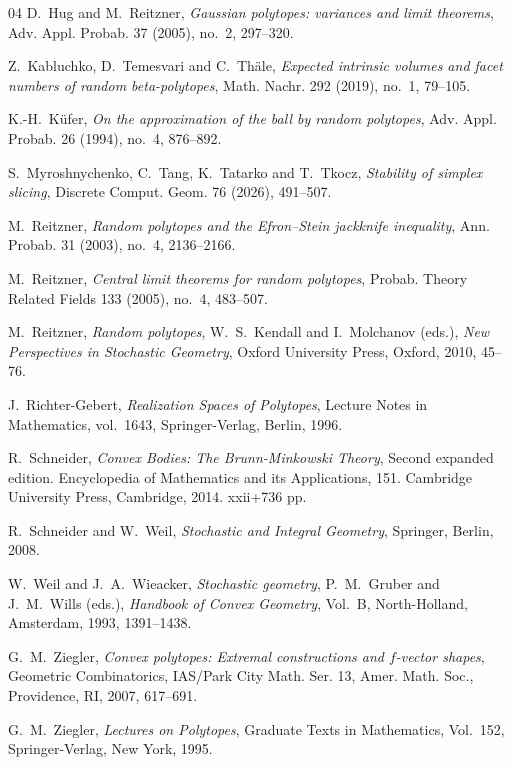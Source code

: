 \documentclass[10pt]{amsart}
\newcommand{\1}{\textbf{1}}
\numberwithin{equation}{section} %
\theoremstyle{remark}
\theoremstyle{definition}
\begin{document}
\begin{thebibliography}{04}
\textrm{D.\ Hug and M.\ Reitzner},
\textit{Gaussian polytopes: variances and limit theorems},
Adv. Appl. Probab. {37} (2005), no.~2, 297--320.

\textrm{Z.\ Kabluchko, D.\ Temesvari and C.\ Th\"ale},
\textit{Expected intrinsic volumes and facet numbers of random beta-polytopes},
Math. Nachr. {292} (2019), no.~1, 79--105.

\textrm{K.-H.\ K\"ufer},
\textit{On the approximation of the ball by random polytopes},
Adv. Appl. Probab. {26} (1994), no.~4, 876--892.

\textrm{S.\ Myroshnychenko, C.\ Tang, K.\ Tatarko and T.\ Tkocz},
\textit{Stability of simplex slicing},
Discrete Comput. Geom. {76} (2026), 491--507.

\textrm{M.\ Reitzner},
\textit{Random polytopes and the Efron--Stein jackknife inequality},
Ann. Probab. {31} (2003), no.~4, 2136--2166.

\textrm{M.\ Reitzner},
\textit{Central limit theorems for random polytopes},
Probab. Theory Related Fields {133} (2005), no.~4, 483--507.

\textrm{M.\ Reitzner},
\textit{Random polytopes},
W.\ S.\ Kendall and I.\ Molchanov (eds.), \textit{New Perspectives in Stochastic Geometry},
Oxford University Press, Oxford, 2010, 45--76.

\textrm{J.\ Richter-Gebert},
\textit{Realization Spaces of Polytopes},
Lecture Notes in Mathematics, vol.~1643,
Springer-Verlag, Berlin, 1996.


 \textrm{R.\ Schneider}, \textit{Convex Bodies: The Brunn-Minkowski Theory},
Second expanded edition. Encyclopedia of Mathematics and its Applications, 151.
Cambridge University Press, Cambridge, 2014. xxii+736 pp.

\textrm{R.\ Schneider and W.\ Weil},
\textit{Stochastic and Integral Geometry},
Springer, Berlin, 2008.

\textrm{W.\ Weil and J.\ A.\ Wieacker},
\textit{Stochastic geometry},
P.\ M.\ Gruber and J.\ M.\ Wills (eds.), \textit{Handbook of Convex Geometry}, Vol.~B,
North-Holland, Amsterdam, 1993, 1391--1438.

\textrm{G.\ M.\ Ziegler},
\textit{Convex polytopes: Extremal constructions and $f$-vector shapes}, Geometric Combinatorics, IAS/Park City Math. Ser. {13},
Amer. Math. Soc., Providence, RI, 2007, 617--691.

\textrm{G.\ M.\ Ziegler},
\textit{Lectures on Polytopes},
Graduate Texts in Mathematics, Vol.~152,
Springer-Verlag, New York, 1995.




\end{thebibliography}
\end{document}
